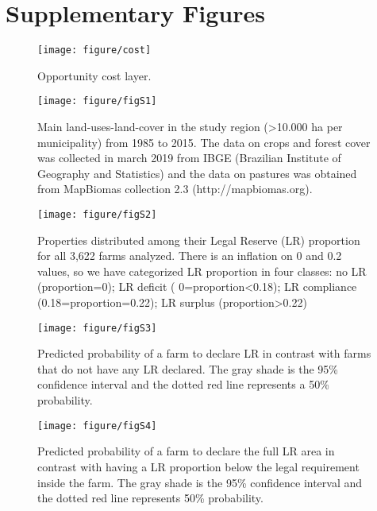 \documentclass[
	12pt,				%
	oneside,			%
	a4paper,			%
	chapter=TITLE,		%
	section=TITLE,		%
	brazil,			%
	english				%
	]{abntex2}
\begin{document}
\hypertarget{supplementary-figures}{%
\section{Supplementary Figures}\label{supplementary-figures}}
\begin{figure}[H]

{\centering \texttt{[image: figure/cost]} 

}

\caption{Opportunity cost layer.}\label{fig:cost}
\end{figure}
\begin{figure}[H]

{\centering \texttt{[image: figure/figS1]} 

}

\caption{Main land-uses-land-cover in the study region (>10.000 ha per municipality) from 1985 to 2015.  The data on crops and forest cover was collected in march 2019 from IBGE (Brazilian Institute of Geography and Statistics) and the data on pastures was obtained from MapBiomas collection 2.3 (http://mapbiomas.org).}\label{fig:figureS1}
\end{figure}
\begin{figure}[H]

{\centering \texttt{[image: figure/figS2]} 

}

\caption{Properties distributed among their Legal Reserve (LR) proportion for all 3,622 farms analyzed. There is an inflation on 0 and 0.2 values, so we have categorized LR proportion in four classes: no LR (proportion=0); LR deficit ( 0=proportion<0.18); LR compliance  (0.18=proportion=0.22); LR surplus (proportion>0.22)}\label{fig:figureS2}
\end{figure}
\begin{figure}[H]

{\centering \texttt{[image: figure/figS3]} 

}

\caption{Predicted probability of a farm to declare LR in contrast with farms that do not have any LR declared. The gray shade is the 95\% confidence interval and the dotted red line represents a 50\% probability.}\label{fig:figureS3}
\end{figure}
\begin{figure}[H]

{\centering \texttt{[image: figure/figS4]} 

}

\caption{Predicted probability of a farm to declare the full LR area in contrast with having a LR proportion below the legal requirement inside the farm.  The gray shade is the 95\% confidence interval and the dotted red line represents 50\% probability.}\label{fig:figureS4}
\end{figure}
\end{document}
